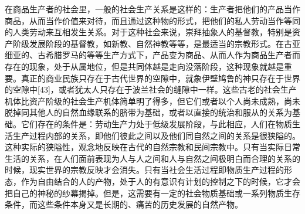 \documentclass{ctexbook}
\begin{document}
    在商品生产者的社会里，一般的社会生产关系是这样的：生产者把他们的产品当作商品，从而当作价值来对待，而且通过这种物的形式，把他们的私人劳动当作等同的人类劳动来互相发生关系。对于这种社会来说，崇拜抽象人的基督教，特别是资产阶级发展阶段的基督教，如新教、自然神教等等，是最适当的宗教形式。在古亚细亚的、古希腊罗马的等等生产方式下，产品变为商品、从而人作为商品生产者而存在的现象，处于从属地位，但是共同体越是走向没落阶段，这种现象就越是重要。真正的商业民族只存在于古代世界的空隙中，就象伊壁鸠鲁的神只存在于世界的空隙中[43]，或者犹太人只存在于波兰社会的缝隙中一样。这些古老的社会生产机体比资产阶级的社会生产机体简单明了得多，但它们或者以个人尚未成熟，尚未脱掉同其他人的自然血缘联系的脐带为基础，或者以直接的统治和服从的关系为基础。它们存在的条件是：劳动生产力处于低级发展阶段，与此相应，人们在物质生活生产过程内部的关系，即他们彼此之间以及他们同自然之间的关系是很狭隘的。这种实际的狭隘性，观念地反映在古代的自然宗教和民间宗教中。只有当实际日常生活的关系，在人们面前表现为人与人之间和人与自然之间极明白而合理的关系的时候，现实世界的宗教反映才会消失。只有当社会生活过程即物质生产过程的形态，作为自由结合的人的产物，处于人的有意识有计划的控制之下的时候，它才会把自己的神秘的纱幕揭掉。但是，这需要有一定的社会物质基础或一系列物质生存条件，而这些条件本身又是长期的、痛苦的历史发展的自然产物。
    
\end{document}
